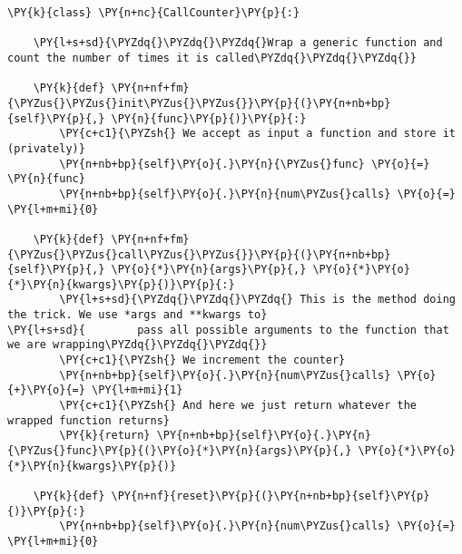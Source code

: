 \begin{Verbatim}[label=\makebox{\url{https://github.com/lucabaldini/cmepda/tree/master/slides/latex/snippets/callable.py}},commandchars=\\\{\}]
\PY{k}{class} \PY{n+nc}{CallCounter}\PY{p}{:}
  
    \PY{l+s+sd}{\PYZdq{}\PYZdq{}\PYZdq{}Wrap a generic function and count the number of times it is called\PYZdq{}\PYZdq{}\PYZdq{}}
    
    \PY{k}{def} \PY{n+nf+fm}{\PYZus{}\PYZus{}init\PYZus{}\PYZus{}}\PY{p}{(}\PY{n+nb+bp}{self}\PY{p}{,} \PY{n}{func}\PY{p}{)}\PY{p}{:}
        \PY{c+c1}{\PYZsh{} We accept as input a function and store it (privately)}
        \PY{n+nb+bp}{self}\PY{o}{.}\PY{n}{\PYZus{}func} \PY{o}{=} \PY{n}{func}
        \PY{n+nb+bp}{self}\PY{o}{.}\PY{n}{num\PYZus{}calls} \PY{o}{=} \PY{l+m+mi}{0}
    
    \PY{k}{def} \PY{n+nf+fm}{\PYZus{}\PYZus{}call\PYZus{}\PYZus{}}\PY{p}{(}\PY{n+nb+bp}{self}\PY{p}{,} \PY{o}{*}\PY{n}{args}\PY{p}{,} \PY{o}{*}\PY{o}{*}\PY{n}{kwargs}\PY{p}{)}\PY{p}{:}
        \PY{l+s+sd}{\PYZdq{}\PYZdq{}\PYZdq{} This is the method doing the trick. We use *args and **kwargs to}
\PY{l+s+sd}{        pass all possible arguments to the function that we are wrapping\PYZdq{}\PYZdq{}\PYZdq{}}
        \PY{c+c1}{\PYZsh{} We increment the counter}
        \PY{n+nb+bp}{self}\PY{o}{.}\PY{n}{num\PYZus{}calls} \PY{o}{+}\PY{o}{=} \PY{l+m+mi}{1}
        \PY{c+c1}{\PYZsh{} And here we just return whatever the wrapped function returns}
        \PY{k}{return} \PY{n+nb+bp}{self}\PY{o}{.}\PY{n}{\PYZus{}func}\PY{p}{(}\PY{o}{*}\PY{n}{args}\PY{p}{,} \PY{o}{*}\PY{o}{*}\PY{n}{kwargs}\PY{p}{)}
    
    \PY{k}{def} \PY{n+nf}{reset}\PY{p}{(}\PY{n+nb+bp}{self}\PY{p}{)}\PY{p}{:}
        \PY{n+nb+bp}{self}\PY{o}{.}\PY{n}{num\PYZus{}calls} \PY{o}{=} \PY{l+m+mi}{0}
\end{Verbatim}